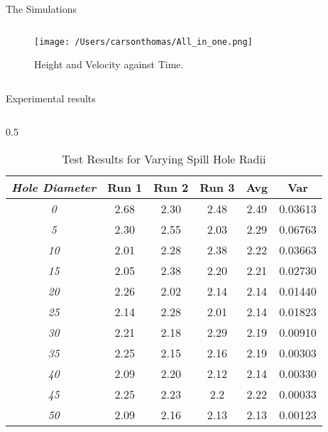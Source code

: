 \documentclass[final]{beamer}
\newlength{\colwidth}
\begin{document}
\begin{frame}[t]
\begin{columns}[t]
\begin{column}{\colwidth}
\begin{block}{The Simulations}
\begin{columns}
    \begin{column}{0.5\textwidth}  %
        \begin{figure}
            \centering
            \texttt{[image: /Users/carsonthomas/All\_in\_one.png]} %
            \caption{Height and Velocity against Time.}
            \label{fig:example}
        \end{figure}
    \end{column}

\end{columns}

\end{block}


  \begin{block}{Experimental results}
\begin{columns}[t]
\hspace{20pt} %
\begin{column}{0.5\colwidth}
\begin{table}[h!]
    \centering
    \begin{tabular}{>{\itshape}c c c c c c}
        \toprule
        Hole Diameter & Run 1 & Run 2 & Run 3 & Avg & Var \\
        \midrule
        0  & 2.68 & 2.30 & 2.48 & 2.49 & 0.03613 \\
        5  & 2.30 & 2.55 & 2.03 & 2.29 & 0.06763 \\
        10 & 2.01 & 2.28 & 2.38 & 2.22 & 0.03663 \\
        15 & 2.05 & 2.38 & 2.20 & 2.21 & 0.02730 \\
        20 & 2.26 & 2.02 & 2.14 & 2.14 & 0.01440 \\
        25 & 2.14 & 2.28 & 2.01 & 2.14 & 0.01823 \\
        30 & 2.21 & 2.18 & 2.29 & 2.19 & 0.00910 \\
        35 & 2.25 & 2.15 & 2.16 & 2.19 & 0.00303 \\
        40 & 2.09 & 2.20 & 2.12 & 2.14 & 0.00330 \\
        45 & 2.25 & 2.23 & 2.2  & 2.22 & 0.00033 \\
        50 & 2.09 & 2.16 & 2.13 & 2.13 & 0.00123 \\
        \bottomrule
    \end{tabular}
    \caption{Test Results for Varying Spill Hole Radii}
    \label{tab:test_results_variance}
\end{table}


\end{column}
\end{columns}
\end{block}
\end{column}
\end{columns}
\end{frame}
\end{document}
